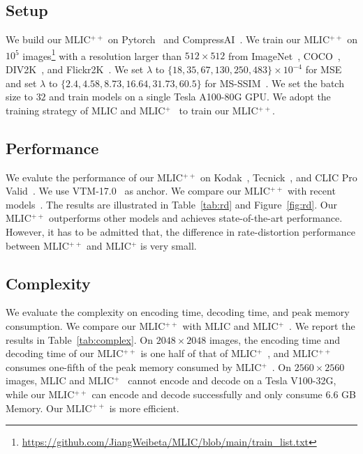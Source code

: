 \documentclass{article}
\theoremstyle{plain}
\theoremstyle{definition}
\theoremstyle{remark}
\begin{document}
  \subsection{Setup}
  \label{sec:exp:setup}
  We build our MLIC$^{++}$ on Pytorch~\cite{paszke2019pytorch} and 
  CompressAI~\cite{begaint2020compressai}.
  We train our MLIC$^{++}$ on $10^5$ images\footnote[1]{\url{https://github.com/JiangWeibeta/MLIC/blob/main/train_list.txt}} with a 
  resolution larger than $512\times 512$
  from ImageNet~\cite{deng2009imagenet},
  COCO~\cite{lin2014microsoft}, DIV2K~\cite{Agustsson2017NTIRE2C}, and Flickr2K~\cite{lim2017enhanced}.
  We set $\lambda$ to $\{18, 35, 67, 130, 250, 483\} \times 10^{-4}$ for MSE
  and set $\lambda$ to $\{2.4, 4.58, 8.73, 16.64, 31.73, 60.5\}$ for MS-SSIM~\cite{wang2003multiscale}.
  We set the batch size to $32$ and train models on a single Tesla A100-80G GPU.
  We adopt the training strategy of MLIC and MLIC$^+$~\cite{jiang2022mlic} to train our MLIC$^{++}$.


  \subsection{Performance}
  \label{sec:exp:perf}
  We evalute the performance of our MLIC$^{++}$ on Kodak~\cite{kodak}, Tecnick~\cite{tecnick2014TESTIMAGES}, and CLIC Pro Valid~\cite{CLIC2020}.
  We use VTM-17.0~\cite{vtm2019} as anchor.
  We compare our MLIC$^{++}$ with recent models~\cite{jiang2022mlic, koyuncu2022contextformer, he2022elic, zou2022the, zhu2022transformerbased, minnen2020channel, cheng2020learned}.
  The results are illustrated in Table~\ref{tab:rd} and Figure~\ref{fig:rd}.
  Our MLIC$^{++}$ outperforms other models and achieves state-of-the-art performance.
  However, it has to be admitted that, the difference in rate-distortion performance between MLIC$^{++}$ and MLIC$^+$ is very small.
  \subsection{Complexity}
  We evaluate the complexity on encoding time, decoding time, and peak memory consumption.
  We compare our MLIC$^{++}$ with MLIC and MLIC$^+$~\cite{jiang2022mlic}.
  We report the results in Table~\ref{tab:complex}.
  On $2048\times 2048$ images, 
  the encoding time and decoding time of our MLIC$^{++}$ is one half of that of MLIC$^+$~\cite{jiang2022mlic},
  and MLIC$^{++}$ consumes one-fifth of the peak memory consumed by MLIC$^+$~\cite{jiang2022mlic}.
  On $2560\times 2560$ images, MLIC and MLIC$^+$~\cite{jiang2022mlic}
  cannot encode and decode on a Tesla V100-32G, while our MLIC$^{++}$
  can encode and decode successfully and only consume $6.6$ GB Memory.
  Our MLIC$^{++}$ is more efficient.
\end{document}
